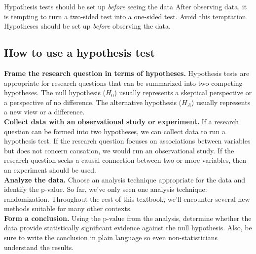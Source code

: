 \begin{caution}{Hypothesis tests should be set up \emph{before} seeing the data}
{After observing data, it is tempting to turn a two-sided test into a one-sided test. Avoid this temptation. Hypotheses should be set up \emph{before} observing the data.}
\end{caution}




\subsection{How to use a hypothesis test}

\noindent\textbf{Frame the research question in terms of hypotheses.} Hypothesis tests are appropriate for research questions that can be summarized into two competing hypotheses. The null hypothesis ($H_0$) usually represents a skeptical perspective or a perspective of no difference. The alternative hypothesis ($H_A$) usually represents a new view or a difference. \\

\noindent\textbf{Collect data with an observational study or experiment.} If a research question can be formed into two hypotheses, we can collect data to run a hypothesis test. If the research question focuses on associations between variables but does not concern causation, we would run an observational study. If the research question seeks a causal connection between two or more variables, then an experiment should be used. \\

\noindent\textbf{Analyze the data.} Choose an analysis technique appropriate for the data and identify the p-value. So far, we've only seen one analysis technique: randomization. Throughout the rest of this textbook, we'll encounter several new methods suitable for many other contexts. \\

\noindent\textbf{Form a conclusion.} Using the p-value from the analysis, determine whether the data provide statistically significant evidence against the null hypothesis. Also, be sure to write the conclusion in plain language so even non-statisticians understand the results.



